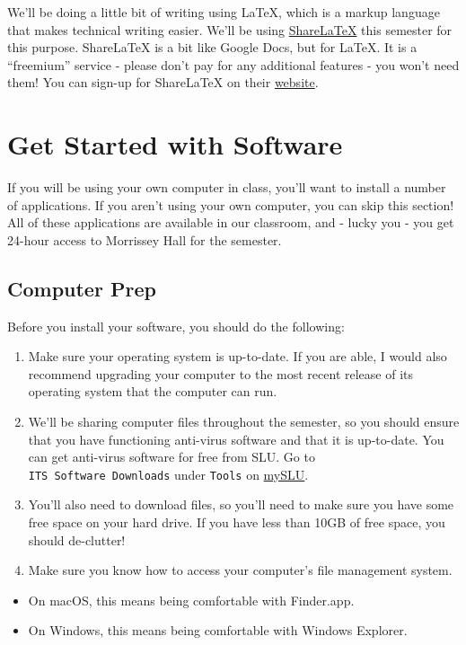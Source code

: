 \documentclass[]{book}
\providecommand{\tightlist}{%
  \setlength{\itemsep}{0pt}\setlength{\parskip}{0pt}}
\theoremstyle{definition}
\theoremstyle{definition}
\theoremstyle{definition}
\theoremstyle{remark}
\begin{document}
We'll be doing a little bit of writing using LaTeX, which is a markup
language that makes technical writing easier. We'll be using
\href{https://www.sharelatex.com}{ShareLaTeX} this semester for this
purpose. ShareLaTeX is a bit like Google Docs, but for LaTeX. It is a
``freemium'' service - please don't pay for any additional features -
you won't need them! You can sign-up for ShareLaTeX on their
\href{https://www.sharelatex.com}{website}.

\section{Get Started with Software}\label{get-started-with-software}

If you will be using your own computer in class, you'll want to install
a number of applications. If you aren't using your own computer, you can
skip this section! All of these applications are available in our
classroom, and - lucky you - you get 24-hour access to Morrissey Hall
for the semester.

\subsection{Computer Prep}\label{computer-prep}

Before you install your software, you should do the following:

\begin{enumerate}
\def\labelenumi{\arabic{enumi}.}
\item
  Make sure your operating system is up-to-date. If you are able, I
  would also recommend upgrading your computer to the most recent
  release of its operating system that the computer can run.
\item
  We'll be sharing computer files throughout the semester, so you should
  ensure that you have functioning anti-virus software and that it is
  up-to-date. You can get anti-virus software for free from SLU. Go to
  \texttt{ITS\ Software\ Downloads} under \texttt{Tools} on
  \href{https://myslu.slu.edu/tools}{mySLU}.
\item
  You'll also need to download files, so you'll need to make sure you
  have some free space on your hard drive. If you have less than 10GB of
  free space, you should de-clutter!
\item
  Make sure you know how to access your computer's file management
  system.
\end{enumerate}

\begin{itemize}
\tightlist
\item
  On macOS, this means being comfortable with Finder.app.
\item
  On Windows, this means being comfortable with Windows Explorer.
\end{itemize}
\end{document}
